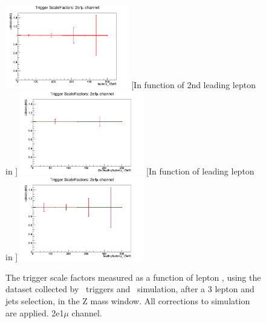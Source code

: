 \begin{figure}[tb]
	[In function of lepton \pt]{
		\includegraphics[width=0.48\textwidth]{Appendix/Figures/trigger/ScaleFactors/2e1mu/SF_trigger_2e1muhistPt.png}
		\label{image:2e1muhistPt.png}
	}
	[In function of 2nd leading lepton in \pt]{
		\includegraphics[width=0.48\textwidth]{Appendix/Figures/trigger/ScaleFactors/2e1mu/SF_trigger_2e1muhistPt_2ndleadinglep.png}
		\label{image:2e1muhistPt_2ndleadinglep.png}
	}
	[In function of leading lepton in \pt]{
		\includegraphics[width=0.48\textwidth]{Appendix/Figures/trigger/ScaleFactors/2e1mu/SF_trigger_2e1muhistPt_leadinglep.png}
		\label{image:2e1muhistPt_leadinglep.png}
	}
	\caption{The trigger scale factors measured as a function of lepton \pt, using the dataset collected by \Etmis\ triggers and \WZ\ simulation, after a 3 lepton and jets selection, in the Z mass window. All corrections to simulation are applied. 2e1$\mu$ channel.}
	\label{image:FigurestriggerScaleFactors2e1mu}
\end{figure}

